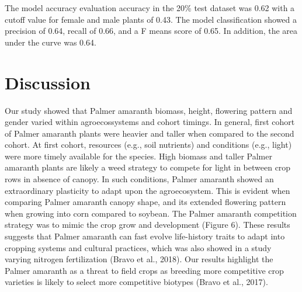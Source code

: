 \documentclass[utf8]{frontiersSCNS}
\begin{document}
The model accuracy evaluation accuracy in the 20\% test dataset was 0.62
with a cutoff value for female and male plants of 0.43. The model
classification showed a precision of 0.64, recall of 0.66, and a F means
score of 0.65. In addition, the area under the curve was 0.64.

\hypertarget{discussion}{%
\section*{Discussion}\label{discussion}}

Our study showed that Palmer amaranth biomass, height, flowering pattern
and gender varied within agroecossystems and cohort timings. In general,
first cohort of Palmer amaranth plants were heavier and taller when
compared to the second cohort. At first cohort, resources (e.g., soil
nutrients) and conditions (e.g., light) were more timely available for
the species. High biomass and taller Palmer amaranth plants are likely a
weed strategy to compete for light in between crop rows in absence of
canopy. In such conditions, Palmer amaranth showed an extraordinary
plasticity to adapt upon the agroecosystem. This is evident when
comparing Palmer amaranth canopy shape, and its extended flowering
pattern when growing into corn compared to soybean. The Palmer amaranth
competition strategy was to mimic the crop grow and development (Figure
6). These results suggests that Palmer amaranth can fast evolve
life-history traits to adapt into cropping systems and cultural
practices, which was also showed in a study varying nitrogen
fertilization (Bravo et al., 2018). Our results highlight the Palmer
amaranth as a threat to field crops as breeding more competitive crop
varieties is likely to select more competitive biotypes (Bravo et al.,
2017).
\end{document}

